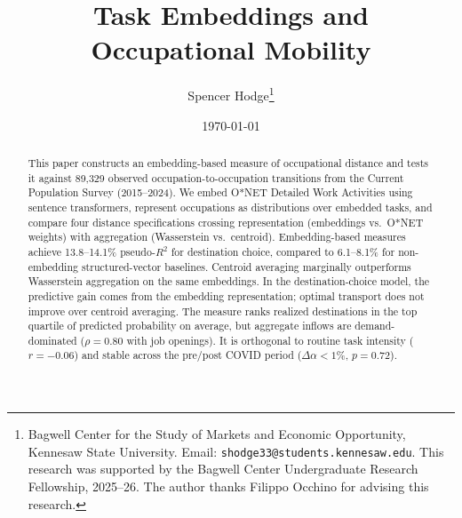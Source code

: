 \documentclass[12pt]{article}
\begin{document}
\title{Task Embeddings and Occupational Mobility}

\author{Spencer Hodge\thanks{Bagwell Center for the Study of Markets and Economic Opportunity, Kennesaw State University. Email: \texttt{shodge33@students.kennesaw.edu}. This research was supported by the Bagwell Center Undergraduate Research Fellowship, 2025--26. The author thanks Filippo Occhino for advising this research.}}

\date{\today}

\maketitle


\begin{abstract}
This paper constructs an embedding-based measure of occupational distance and tests it against 89,329 observed occupation-to-occupation transitions from the Current Population Survey (2015--2024). We embed O*NET Detailed Work Activities using sentence transformers, represent occupations as distributions over embedded tasks, and compare four distance specifications crossing representation (embeddings vs.\ O*NET weights) with aggregation (Wasserstein vs.\ centroid). Embedding-based measures achieve 13.8--14.1\% pseudo-$R^2$ for destination choice, compared to 6.1--8.1\% for non-embedding structured-vector baselines. Centroid averaging marginally outperforms Wasserstein aggregation on the same embeddings. In the destination-choice model, the predictive gain comes from the embedding representation; optimal transport does not improve over centroid averaging. The measure ranks realized destinations in the top quartile of predicted probability on average, but aggregate inflows are demand-dominated ($\rho = 0.80$ with job openings). It is orthogonal to routine task intensity ($r = -0.06$) and stable across the pre/post COVID period ($\Delta\alpha < 1\%$, $p = 0.72$).
\end{abstract}


\vspace{1em}
\noindent{}
\vspace{1em}
\end{document}
